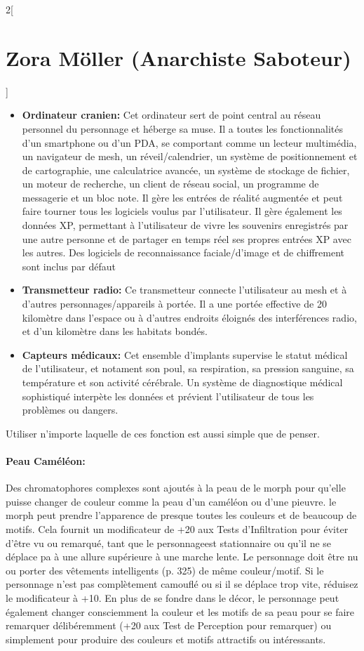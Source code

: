 \documentclass[a4paper,9pt]{article}
\begin{document}
\begin{multicols}{2}[\section*{Zora Möller (Anarchiste Saboteur)}]
   \begin{itemize}
      \item \textbf{Ordinateur cranien:} Cet ordinateur sert de point central au
         réseau personnel du personnage et héberge sa muse. Il a toutes
         les fonctionnalités d'un smartphone ou d'un PDA, se comportant comme un
         lecteur multimédia, un navigateur de mesh, un réveil/calendrier, un
         système de positionnement et de cartographie, une calculatrice avancée,
         un système de stockage de fichier, un moteur de recherche, un client de
         réseau social, un programme de messagerie et un bloc note. Il gère les
         entrées de réalité augmentée et peut faire tourner tous les logiciels
         voulus par l'utilisateur. Il gère également les données XP, permettant à
         l'utilisateur de vivre les souvenirs enregistrés par une autre personne et
         de partager en temps réel ses propres entrées XP avec les autres. Des
         logiciels de reconnaissance faciale/d'image et de chiffrement
         sont inclus par défaut
      \item \textbf{Transmetteur radio:} Ce transmetteur connecte l'utilisateur au
         mesh et à d'autres personnages/appareils à portée. Il a une portée
         effective de 20 kilomètre dans l'espace ou à d'autres endroits éloignés
         des interférences radio, et d'un kilomètre dans les habitats bondés.
      \item \textbf{Capteurs médicaux:} Cet ensemble d'implants supervise le
         statut médical de l'utilisateur, et notament son poul, sa respiration, sa
         pression sanguine, sa température et son activité cérébrale. Un système de
         diagnostique médical sophistiqué interpète les données et prévient
         l'utilisateur de tous les problèmes ou dangers.
   \end{itemize} 

   Utiliser n'importe laquelle de ces fonction est aussi simple que de penser.

   \paragraph{Peau Caméléon:} Des chromatophores complexes sont ajoutés à la peau de
   le morph pour qu'elle puisse changer de couleur comme la peau d'un caméléon ou
   d'une pieuvre. le morph peut prendre l'apparence de presque toutes les couleurs
   et de beaucoup de motifs. Cela fournit un modificateur de +20 aux Tests
   d'Infiltration pour éviter d'être vu ou remarqué, tant que le personnageest
   stationnaire ou qu'il ne se déplace pa à une allure supérieure à une marche
   lente. Le personnage doit être nu ou porter des vêtements intelligents (p. 325)
   de même couleur/motif. Si le personnage n'est pas complètement camouflé ou si
   il se déplace trop vite, réduisez le modificateur à +10. En plus de se fondre
   dans le décor, le personnage peut également changer consciemment la couleur et
   les motifs de sa peau pour se faire remarquer délibéremment (+20 aux Test de
   Perception pour remarquer) ou simplement pour produire des couleurs et motifs
   attractifs ou intéressants.


\end{multicols}
\end{document}
